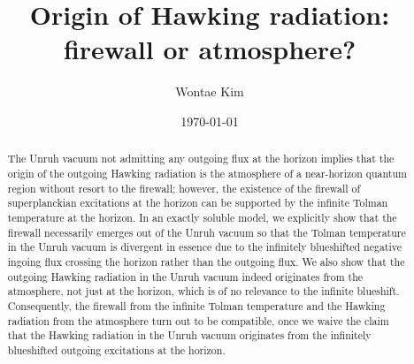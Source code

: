 \documentclass[aps,preprint,a4paper,showpacs,showkeys,superscriptaddress]{revtex4-1}
\begin{document}

\title{Origin of Hawking radiation: firewall or atmosphere?}



\author{Wontae Kim}%
%
%



\date{\today}

\begin{abstract}
The Unruh vacuum not admitting any outgoing flux at the horizon implies that
the origin of the outgoing Hawking radiation is the atmosphere of a near-horizon quantum
region without resort to the firewall; however,
the existence of the firewall of superplanckian excitations at the horizon
can be supported by the infinite Tolman temperature at the horizon.
In an exactly soluble model,
we explicitly show that the firewall necessarily emerges out of the Unruh vacuum
so that the Tolman temperature in the Unruh vacuum is divergent
in essence due to the infinitely blueshifted negative ingoing flux crossing the horizon
rather than the outgoing flux.
We also show that
the outgoing Hawking radiation in the Unruh vacuum indeed originates from the atmosphere,
not just at the horizon, which is of no relevance to the infinite blueshift.
Consequently, the firewall from the infinite Tolman temperature
and the Hawking radiation from the atmosphere turn out to be compatible,
once we waive the claim that the Hawking radiation in the Unruh vacuum originates from the infinitely blueshifted
outgoing excitations at the horizon.

\end{abstract}



\maketitle
\end{document}

